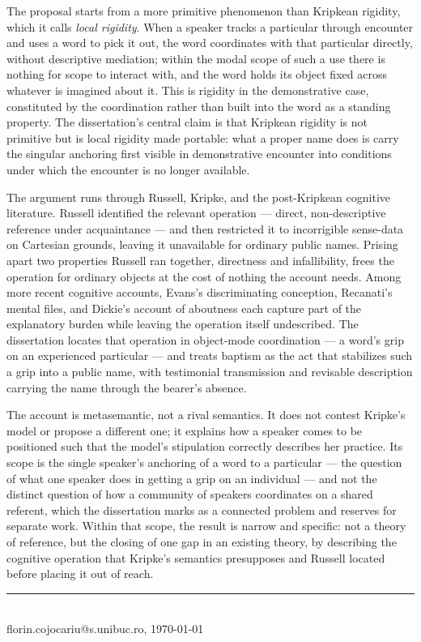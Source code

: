 \documentclass[11pt]{article}
\begin{document}
The proposal starts from a more primitive phenomenon than Kripkean rigidity, which it calls \emph{local rigidity}. When a speaker tracks a particular through encounter and uses a word to pick it out, the word coordinates with that particular directly, without descriptive mediation; within the modal scope of such a use there is nothing for scope to interact with, and the word holds its object fixed across whatever is imagined about it. This is rigidity in the demonstrative case, constituted by the coordination rather than built into the word as a standing property. The dissertation's central claim is that Kripkean rigidity is not primitive but is local rigidity made portable: what a proper name does is carry the singular anchoring first visible in demonstrative encounter into conditions under which the encounter is no longer available.

The argument runs through Russell, Kripke, and the post-Kripkean cognitive literature. Russell identified the relevant operation --- direct, non-descriptive reference under acquaintance --- and then restricted it to incorrigible sense-data on Cartesian grounds, leaving it unavailable for ordinary public names. Prising apart two properties Russell ran together, directness and infallibility, frees the operation for ordinary objects at the cost of nothing the account needs. Among more recent cognitive accounts, Evans's discriminating conception, Recanati's mental files, and Dickie's account of aboutness each capture part of the explanatory burden while leaving the operation itself undescribed. The dissertation locates that operation in object-mode coordination --- a word's grip on an experienced particular --- and treats baptism as the act that stabilizes such a grip into a public name, with testimonial transmission and revisable description carrying the name through the bearer's absence.

The account is metasemantic, not a rival semantics. It does not contest Kripke's model or propose a different one; it explains how a speaker comes to be positioned such that the model's stipulation correctly describes her practice. Its scope is the single speaker's anchoring of a word to a particular --- the question of what one speaker does in getting a grip on an individual --- and not the distinct question of how a community of speakers coordinates on a shared referent, which the dissertation marks as a connected problem and reserves for separate work. Within that scope, the result is narrow and specific: not a theory of reference, but the closing of one gap in an existing theory, by describing the cognitive operation that Kripke's semantics presupposes and Russell located before placing it out of reach.

\vfill
\noindent\rule{\textwidth}{0.4pt}\\[2pt]
{\tiny florin.cojocariu@s.unibuc.ro, \today}
\end{document}
